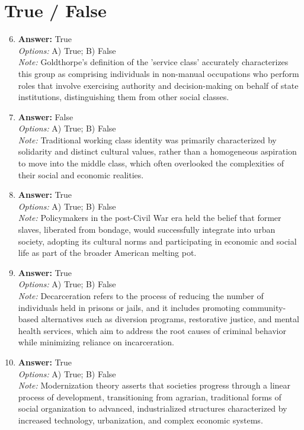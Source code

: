 \documentclass[12pt]{article}
\begin{document}
\section*{True / False}
\begin{enumerate}[label=\arabic*.]
\setcounter{enumi}{5}
\item \textbf{Answer:} True
\\ \textit{Options:} A) True; B) False
\\ \textit{Note:} Goldthorpe's definition of the 'service class' accurately characterizes this group as comprising individuals in non-manual occupations who perform roles that involve exercising authority and decision-making on behalf of state institutions, distinguishing them from other social classes.
\item \textbf{Answer:} False
\\ \textit{Options:} A) True; B) False
\\ \textit{Note:} Traditional working class identity was primarily characterized by solidarity and distinct cultural values, rather than a homogeneous aspiration to move into the middle class, which often overlooked the complexities of their social and economic realities.
\item \textbf{Answer:} True
\\ \textit{Options:} A) True; B) False
\\ \textit{Note:} Policymakers in the post-Civil War era held the belief that former slaves, liberated from bondage, would successfully integrate into urban society, adopting its cultural norms and participating in economic and social life as part of the broader American melting pot.
\item \textbf{Answer:} True
\\ \textit{Options:} A) True; B) False
\\ \textit{Note:} Decarceration refers to the process of reducing the number of individuals held in prisons or jails, and it includes promoting community-based alternatives such as diversion programs, restorative justice, and mental health services, which aim to address the root causes of criminal behavior while minimizing reliance on incarceration.
\item \textbf{Answer:} True
\\ \textit{Options:} A) True; B) False
\\ \textit{Note:} Modernization theory asserts that societies progress through a linear process of development, transitioning from agrarian, traditional forms of social organization to advanced, industrialized structures characterized by increased technology, urbanization, and complex economic systems.
\end{enumerate}
\end{document}
